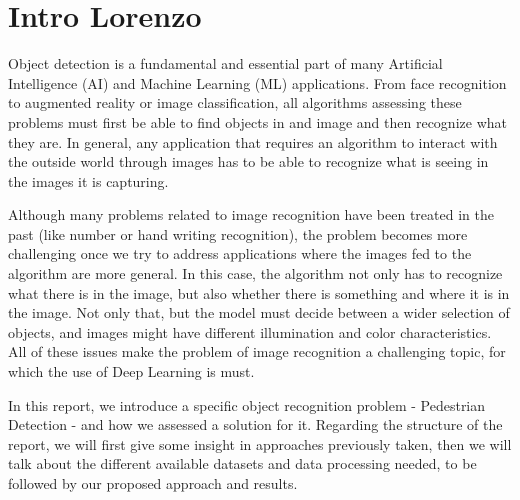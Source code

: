 \section{Intro Lorenzo}

Object detection is a fundamental and essential part of many Artificial Intelligence (AI) and Machine Learning (ML) applications. From face recognition to augmented reality or image classification, all algorithms assessing these problems must first be able to find objects in and image and then recognize what they are. In general, any application that requires an algorithm to interact with the outside world through images has to be able to recognize what is seeing in the images it is capturing.

Although many problems related to image recognition have been treated in the past (like number or hand writing recognition), the problem becomes more challenging once we try to address applications where the images fed to the algorithm are more general. In this case, the algorithm not only has to recognize what there is in the image, but also whether there is something and where it is in the image. Not only that, but the model must decide between a wider selection of objects, and images might have different illumination and color characteristics. All of these issues make the problem of image recognition a challenging topic, for which the use of Deep Learning is must.

In this report, we introduce a specific object recognition problem - Pedestrian Detection - and how we assessed a solution for it. Regarding the structure of the report, we will first give some insight in approaches previously taken, then we will talk about the different available datasets and data processing needed, to be followed by our proposed approach and results.
